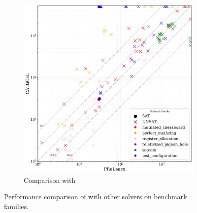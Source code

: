 \begin{figure}[!t]
\begin{subfigure}[t]{0.45\textwidth}
        \includegraphics[width=\textwidth]{figs/prelearn_vs_cautical_interesting_legend.jpg}
        \caption{Comparison with \prelearn}
        \label{fig:cautical-vs-prelearn}
    \end{subfigure}

    \caption{Performance comparison of \tool with other solvers on benchmark families.}
    \label{fig:solver-comparison-familis}
\end{figure}












